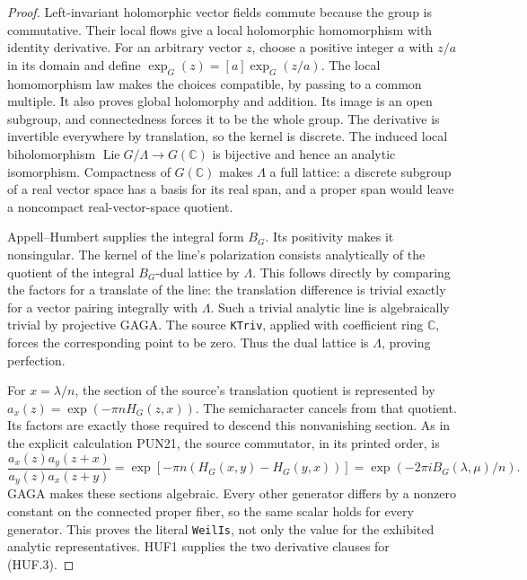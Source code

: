 \documentclass[11pt,a4paper]{article}
\numberwithin{equation}{section}
\theoremstyle{remark}\newtheorem{remark}[theorem]{Remark}
\begin{document}
\begin{proof}
Left-invariant holomorphic vector fields commute because the group
is commutative.  Their local flows give a local holomorphic
homomorphism with identity derivative.  For an arbitrary vector
\(z\), choose a positive integer \(a\) with \(z/a\) in its
domain and define \(\exp_G(z)=[a]\exp_G(z/a)\).
The local homomorphism law makes the choices compatible, by
passing to a common multiple.  It also proves global
holomorphy and addition.  Its image is an open subgroup,
and connectedness forces it to be the whole group.
The derivative is invertible everywhere by translation, so the
kernel is discrete.  The induced local biholomorphism
\(\operatorname{Lie}G/\Lambda\to G(\mathbb C)\) is bijective
and hence an analytic isomorphism.  Compactness of \(G(\mathbb C)\)
makes \(\Lambda\) a full lattice: a discrete subgroup of a real
vector space has a basis for its real span, and a proper span
would leave a noncompact real-vector-space quotient.

Appell--Humbert supplies the integral form \(B_G\).
Its positivity makes it nonsingular.  The kernel of the line's
polarization consists analytically of the quotient of the
integral \(B_G\)-dual lattice by \(\Lambda\).  This follows
directly by comparing the factors for a translate of the line:
the translation difference is trivial exactly for a vector
pairing integrally with \(\Lambda\).  Such a trivial analytic
line is algebraically trivial by projective GAGA.
The source \texttt{KTriv}, applied with coefficient ring
\(\mathbb C\), forces the corresponding point to be zero.
Thus the dual lattice is \(\Lambda\), proving perfection.

For \(x=\lambda/n\), the section of the source's translation
quotient is represented by
\(a_x(z)=\exp(-\pi nH_G(z,x))\).
The semicharacter cancels from that quotient.  Its factors
are exactly those required to descend this nonvanishing
section.  As in the explicit calculation PUN21, the source
commutator, in its printed order, is
\[
 \frac{a_x(z)a_y(z+x)}{a_y(z)a_x(z+y)}
   =\exp[-\pi n(H_G(x,y)-H_G(y,x))]
   =\exp(-2\pi iB_G(\lambda,\mu)/n).
\]
GAGA makes these sections algebraic.  Every other generator
differs by a nonzero constant on the connected proper fiber,
so the same scalar holds for every generator.  This proves
the literal \texttt{Weil\allowbreak Is}, not only the value for the
exhibited analytic representatives.  HUF1 supplies the two
derivative clauses for (HUF.3).
\end{proof}
\end{document}
